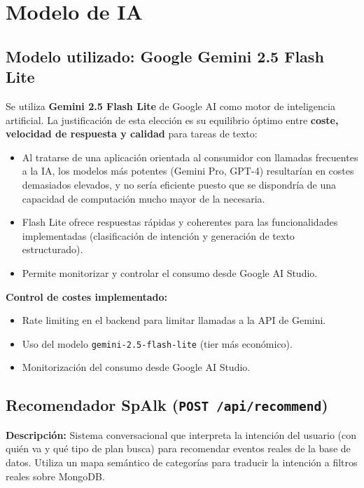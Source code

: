 \documentclass[12pt, a4paper]{article}
\begin{document}
\section{Modelo de IA}

\subsection{Modelo utilizado: Google Gemini 2.5 Flash Lite}

Se utiliza \textbf{Gemini 2.5 Flash Lite} de Google AI como motor de inteligencia
artificial. La justificación de esta elección es su equilibrio óptimo entre
\textbf{coste, velocidad de respuesta y calidad} para tareas de texto:

\begin{itemize}[leftmargin=1.4em]
  \item Al tratarse de una aplicación orientada al consumidor con llamadas frecuentes a
    la IA, los modelos más potentes (Gemini Pro, GPT-4) resultarían en costes demasiados elevados, y no sería eficiente puesto que se dispondría de una capacidad de computación mucho mayor de la necesaria.
  \item Flash Lite ofrece respuestas rápidas y coherentes para las funcionalidades
    implementadas (clasificación de intención y generación de texto estructurado).
  \item Permite monitorizar y controlar el consumo desde Google AI Studio.
\end{itemize}

\textbf{Control de costes implementado:}
\begin{itemize}[leftmargin=1.4em]
  \item Rate limiting en el backend para limitar llamadas a la API de Gemini.
  \item Uso del modelo \texttt{gemini-2.5-flash-lite} (tier más económico).
  \item Monitorización del consumo desde Google AI Studio.
\end{itemize}

\subsection{Recomendador SpAlk (\texttt{POST /api/recommend})}

\textbf{Descripción:} Sistema conversacional que interpreta la intención del usuario
(con quién va y qué tipo de plan busca) para recomendar eventos reales de la base de datos.
Utiliza un mapa semántico de categorías para traducir la intención a filtros reales sobre
MongoDB.
\end{document}
